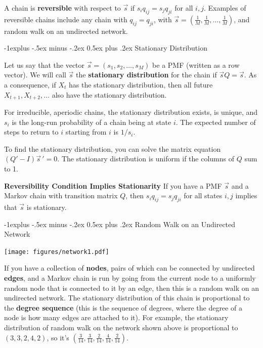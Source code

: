 \documentclass[10pt,landscape]{article}
\makeatletter
\renewcommand{\subsection}{\@startsection{subsection}{2}{0mm}%
                                {-1explus -.5ex minus -.2ex}%
                                {0.5ex plus .2ex}%
                                {\normalfont\normalsize\bfseries}}
\makeatother
\begin{document}
\begin{multicols*}{3}
	A chain is \textbf{reversible} with respect to $\vec{s}$ if $s_iq_{ij} = s_jq_{ji}$ for all $i, j$.  Examples of reversible chains include any chain with $q_{ij} = q_{ji}$, with $\vec{s} = (\frac{1}{M}, \frac{1}{M}, \dots, \frac{1}{M})$, and random walk on an undirected network.
									
	\subsection{Stationary Distribution}
									
	Let us say that the vector $\vec{s} = (s_1, s_2, \dots, s_M)$ be a PMF  (written as a row vector). We will call $\vec{s}$ the \textbf{stationary distribution} for the chain if $\vec{s}Q = \vec{s}$. As a consequence, if $X_t$ has the stationary distribution, then all future $X_{t+1}, X_{t + 2}, \dots$ also have the stationary distribution. \\
									
	\smallskip
									
	For irreducible, aperiodic chains, the stationary distribution exists, is unique, and $s_i$ is the long-run probability of a chain being at state $i$. The expected number of steps to return to $i$ starting from $i$ is $1/s_i$.
									
	\smallskip
									
	To find the stationary distribution, you can solve the matrix equation $(Q' - I){\vec{s}\,}'= 0$. The stationary distribution is uniform if the columns of $Q$ sum to 1.
									
	\smallskip
									
	\textbf{Reversibility Condition Implies Stationarity}  If you have a PMF $\vec{s}$ and a Markov chain with transition matrix $Q$, then $s_iq_{ij} = s_jq_{ji}$ for all states $i, j$ implies that $\vec{s}$ is stationary.
									
	\subsection{Random Walk on an Undirected Network}
	\begin{minipage}{\linewidth}
		\centering
		\texttt{[image: figures/network1.pdf]}
	\end{minipage}
	\medskip
									
	If you have a collection of \textbf{nodes}, pairs of which can be connected by undirected \textbf{edges}, and a Markov chain is run by going from the current node to a uniformly random node that is connected to it by an edge, then  this is a random walk on an undirected network. The stationary distribution of this chain is proportional to the \textbf{degree sequence} (this is the sequence of degrees, where the degree of a node is how many edges are attached to it). For example, the stationary distribution of random walk on the network shown above is proportional to $(3,3,2,4,2)$, so it's $(\frac{3}{14}, \frac{3}{14}, \frac{2}{14}, \frac{4}{14}, \frac{2}{14})$. 
									

\end{multicols*}
\end{document}
